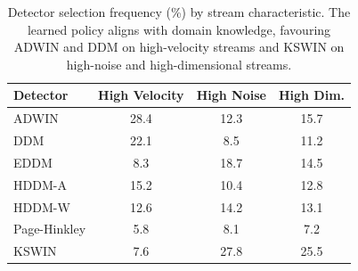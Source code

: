 \documentclass[conference]{IEEEtran}
\begin{document}
\begin{table}[!ht]
\centering
\caption{Accuracy (\%) broken down by drift type under GaussianNB. AutoDD leads on sudden, incremental, and recurring drift, while Meta-ADD edges ahead on gradual drift owing to its learned drift-type representations.}
\label{tab:drift_type}
\end{table}


\begin{table}[!ht]
\centering
\caption{Detector selection frequency (\%) by stream characteristic. The learned policy aligns with domain knowledge, favouring ADWIN and DDM on high-velocity streams and KSWIN on high-noise and high-dimensional streams.}
\label{tab:selection_pattern}
\small
\begin{tabular}{|l|c|c|c|}
\hline
\textbf{Detector} & \textbf{High Velocity} & \textbf{High Noise} & \textbf{High Dim.} \\
\hline
ADWIN & 28.4 & 12.3 & 15.7 \\
DDM & 22.1 & 8.5 & 11.2 \\
EDDM & 8.3 & 18.7 & 14.5 \\
HDDM-A & 15.2 & 10.4 & 12.8 \\
HDDM-W & 12.6 & 14.2 & 13.1 \\
Page-Hinkley & 5.8 & 8.1 & 7.2 \\
KSWIN & 7.6 & 27.8 & 25.5 \\
\hline
\end{tabular}
\end{table}
\end{document}
